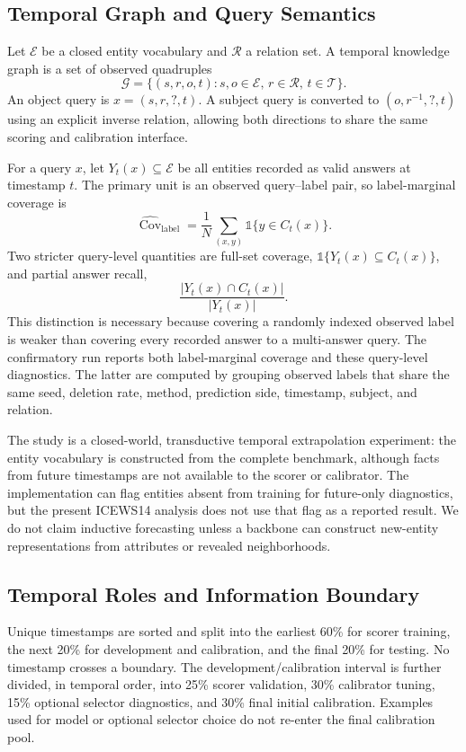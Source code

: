 \documentclass[10pt,twocolumn]{article}
\newcommand{\cov}{\operatorname{Cov}}
\begin{document}
\subsection{Temporal Graph and Query Semantics}

Let \(\mathcal{E}\) be a closed entity vocabulary and \(\mathcal{R}\) a relation
set. A temporal knowledge graph is a set of observed quadruples
\[
  \mathcal{G}=\{(s,r,o,t):s,o\in\mathcal{E},\,r\in\mathcal{R},\,t\in\mathcal{T}\}.
\]
An object query is \(x=(s,r,?,t)\). A subject query is converted to
\((o,r^{-1},?,t)\) using an explicit inverse relation, allowing both directions
to share the same scoring and calibration interface.

For a query \(x\), let \(Y_t(x)\subseteq\mathcal{E}\) be all entities recorded
as valid answers at timestamp \(t\). The primary unit is an observed
query--label pair, so label-marginal coverage is
\[
  \widehat{\cov}_{\mathrm{label}}
  =\frac{1}{N}\sum_{(x,y)}\mathbb{1}\{y\in C_t(x)\}.
\]
Two stricter query-level quantities are full-set coverage,
\(\mathbb{1}\{Y_t(x)\subseteq C_t(x)\}\), and partial answer recall,
\[
  \frac{|Y_t(x)\cap C_t(x)|}{|Y_t(x)|}.
\]
This distinction is necessary because covering a randomly indexed observed
label is weaker than covering every recorded answer to a multi-answer query.
The confirmatory run reports both label-marginal coverage and these query-level
diagnostics. The latter are computed by grouping observed labels that share the
same seed, deletion rate, method, prediction side, timestamp, subject, and
relation.

The study is a closed-world, transductive temporal extrapolation experiment:
the entity vocabulary is constructed from the complete benchmark, although
facts from future timestamps are not available to the scorer or calibrator.
The implementation can flag entities absent from training for future-only
diagnostics, but the present ICEWS14 analysis does not use that flag as a
reported result. We do not claim inductive forecasting unless a backbone can
construct new-entity representations from attributes or revealed neighborhoods.

\subsection{Temporal Roles and Information Boundary}

Unique timestamps are sorted and split into the earliest 60\% for scorer
training, the next 20\% for development and calibration, and the final 20\% for
testing. No timestamp crosses a boundary. The development/calibration interval
is further divided, in temporal order, into 25\% scorer validation, 30\%
calibrator tuning, 15\% optional selector diagnostics, and 30\% final initial
calibration. Examples used for model or optional selector choice do not re-enter
the final calibration pool.
\end{document}
